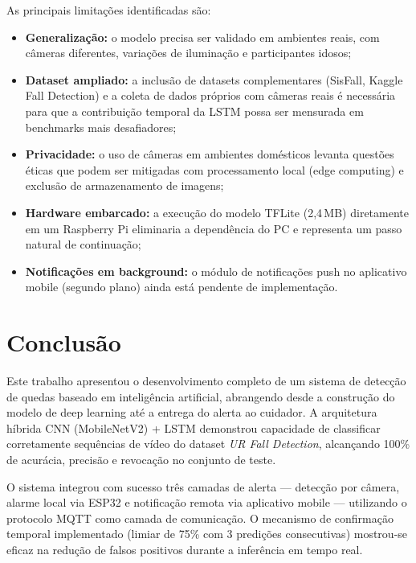 \documentclass[12pt,a4paper]{article}
\begin{document}
As principais limitações identificadas são:

\begin{itemize}[nosep]
  \item \textbf{Generalização:} o modelo precisa ser validado em ambientes reais, com câmeras diferentes, variações de iluminação e participantes idosos;
  \item \textbf{Dataset ampliado:} a inclusão de datasets complementares (SisFall, Kaggle Fall Detection) e a coleta de dados próprios com câmeras reais é necessária para que a contribuição temporal da LSTM possa ser mensurada em benchmarks mais desafiadores;
  \item \textbf{Privacidade:} o uso de câmeras em ambientes domésticos levanta questões éticas que podem ser mitigadas com processamento local (edge computing) e exclusão de armazenamento de imagens;
  \item \textbf{Hardware embarcado:} a execução do modelo TFLite (2,4\,MB) diretamente em um Raspberry Pi eliminaria a dependência do PC e representa um passo natural de continuação;
  \item \textbf{Notificações em background:} o módulo de notificações push no aplicativo mobile (segundo plano) ainda está pendente de implementação.
\end{itemize}

\section{Conclusão}

Este trabalho apresentou o desenvolvimento completo de um sistema de detecção de quedas baseado em inteligência artificial, abrangendo desde a construção do modelo de deep learning até a entrega do alerta ao cuidador. A arquitetura híbrida CNN (MobileNetV2) + LSTM demonstrou capacidade de classificar corretamente sequências de vídeo do dataset \textit{UR Fall Detection}, alcançando 100\% de acurácia, precisão e revocação no conjunto de teste.

O sistema integrou com sucesso três camadas de alerta — detecção por câmera, alarme local via ESP32 e notificação remota via aplicativo mobile — utilizando o protocolo MQTT como camada de comunicação. O mecanismo de confirmação temporal implementado (limiar de 75\% com 3 predições consecutivas) mostrou-se eficaz na redução de falsos positivos durante a inferência em tempo real.
\end{document}
